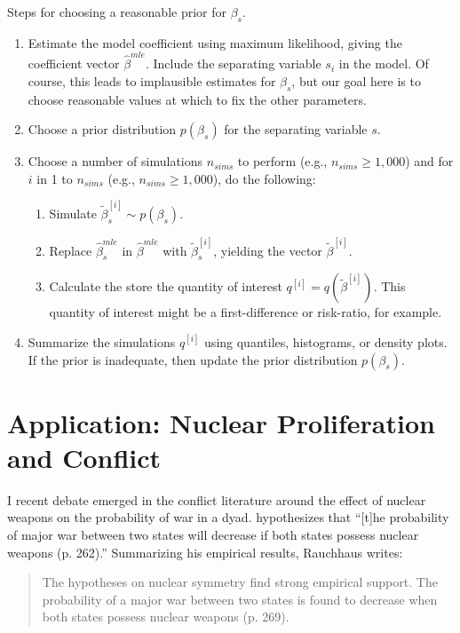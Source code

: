 \documentclass[12pt]{article}
\begin{document}
Steps for choosing a reasonable prior for $\beta_s$.
\begin{enumerate}
\item Estimate the model coefficient using maximum likelihood, giving the coefficient vector $\hat{\beta}^{mle}$. Include the separating variable $s_i$ in the model. Of course, this leads to implausible estimates for $\beta_s$, but our goal here is to choose reasonable values at which to fix the other parameters. 
\item Choose a prior distribution $p(\beta_s)$ for the separating variable $s$. 
\item Choose a number of simulations $n_{sims}$ to perform (e.g., $n_{sims} \geq 1,000$) and for $i$ in 1 to $n_{sims}$ (e.g., $n_{sims} \geq 1,000$), do the following:
	\begin{enumerate}
	\item Simulate $\tilde{\beta}^{[i]}_s \sim p(\beta_s)$.
	\item Replace $\hat{\beta}_s^{mle}$ in $\hat{\beta}^{mle}$ with $\tilde{\beta}^{[i]}_s$, yielding the vector $\tilde{\beta}^{[i]}$.
	\item Calculate the store the quantity of interest $q^{[i]} = q\left(\tilde{\beta}^{[i]}\right)$. This quantity of interest might be a first-difference or risk-ratio, for example.
	\end{enumerate}
\item Summarize the simulations $q^{[i]}$ using quantiles, histograms, or density plots. If the prior is inadequate, then update the prior distribution $p(\beta_s)$.
\end{enumerate}

\section*{Application: Nuclear Proliferation and Conflict}

I recent debate emerged in the conflict literature around the effect of nuclear weapons on the probability of war in a dyad. \cite{Rauchhaus2009} hypothesizes that ``[t]he probability of major war between two states will decrease if both states possess nuclear weapons (p. 262).'' Summarizing his empirical results, Rauchhaus writes:

\begin{quote} 
The hypotheses on nuclear symmetry find strong empirical support. The probability of a major war between two states is found to decrease when both states possess nuclear weapons (p. 269).
\end{quote}
\end{document}
